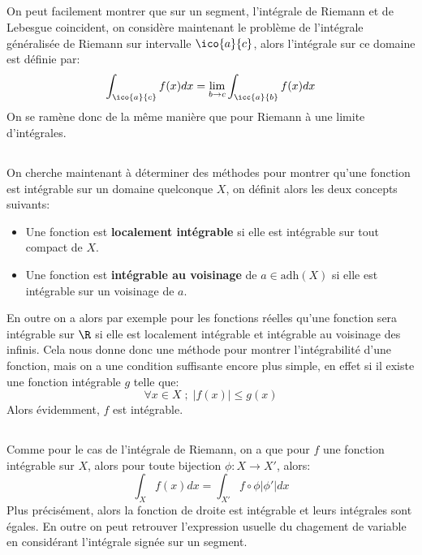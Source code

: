 \pagebreak
\subsection*{}
On peut facilement montrer que sur un segment, l'intégrale de Riemann et de Lebesgue coincident, on considère maintenant le problème de l'intégrale généralisée de Riemann sur intervalle \(\ico{a}{c}\), alors l'intégrale sur ce domaine est définie par:
\[
   \int_{\ico{a}{c}} f(x)dx = \lim_{b \rightarrow c} \int_{\icc{a}{b}} f(x)dx
\]
On se ramène donc de la même manière que pour Riemann à une limite d'intégrales. 
\subsection*{}
On cherche maintenant à déterminer des méthodes pour montrer qu'une fonction est intégrable sur un domaine quelconque \(X\), on définit alors les deux concepts suivants:
\begin{itemize}
   \item Une fonction est \textbf{localement intégrable} si elle est intégrable sur tout compact de \(X\).
   \item Une fonction est \textbf{intégrable au voisinage} de \(a \in \text{adh}(X)\) si elle est intégrable sur un voisinage de \(a\).
\end{itemize}
En outre on a alors par exemple pour les fonctions réelles qu'une fonction sera intégrable sur \(\R\) si elle est localement intégrable et intégrable au voisinage des infinis. Cela nous donne donc une méthode pour montrer l'intégrabilité d'une fonction, mais on a une condition suffisante encore plus simple, en effet si il existe une fonction intégrable \(g\) telle que:
\[
   \forall x \in X \; ; \; |f(x)| \leq g(x)
\]
Alors évidemment, \(f\) est intégrable.

\subsection*{}
Comme pour le cas de l'intégrale de Riemann, on a que pour \(f\) une fonction intégrable sur \(X\), alors pour toute bijection \(\phi : X \rightarrow X'\), alors:
\[
   \int_{X} f(x) dx = \int_{X'} f \circ \phi |\phi'|dx   
\]
Plus précisément, alors la fonction de droite est intégrable et leurs intégrales sont égales. En outre on peut retrouver l'expression usuelle du chagement de variable en considérant l'intégrale signée sur un segment.
